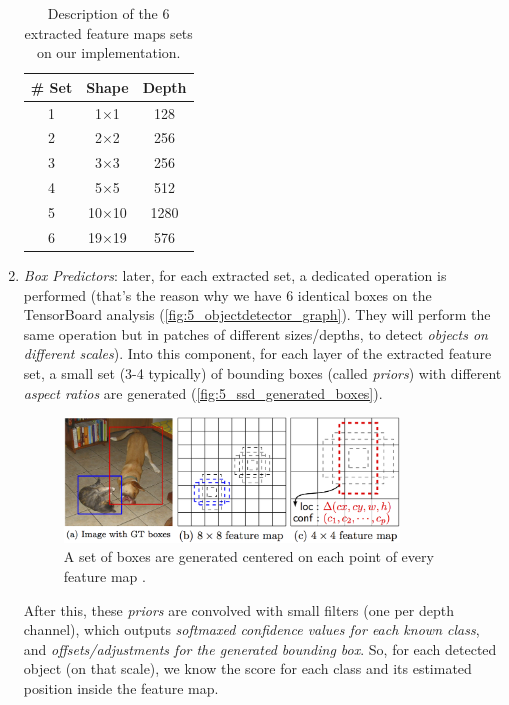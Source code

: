 \begin{enumerate}
			\begin{table}[h]
				\centering
				\begin{tabular}{|c|c|c|}\hline
					\textbf{\# Set} & \textbf{Shape} & \textbf{Depth} \\ \hline
					1              & 1$\times$1     & 128            \\
					2              & 2$\times$2     & 256            \\
					3              & 3$\times$3     & 256            \\
					4              & 5$\times$5     & 512            \\
					5              & 10$\times$10   & 1280           \\
					6              & 19$\times$19   & 576           \\ \hline
				\end{tabular}
				\caption{Description of the 6 extracted feature maps sets on our implementation.}
				\label{tab:5_sets_imagenet}
			\end{table}
	
			
			\item \emph{Box Predictors}: later, for each extracted set, a dedicated operation is performed (that's the reason why we have 6 identical boxes on the TensorBoard analysis (\autoref{fig:5_objectdetector_graph}). They will perform the same operation but in patches of different sizes/depths, to detect \emph{objects on different scales}). Into this component, for each layer of the extracted feature set, a small set (3-4 typically) of bounding boxes (called \emph{priors}) with different \emph{aspect ratios} are generated (\autoref{fig:5_ssd_generated_boxes}).
			
			\begin{figure}[h]
				\centering
				\includegraphics[width=3.5in]{images/ssd_generated_boxes}
				\caption{A set of boxes are generated centered on each point of every feature map \cite{ssd-paper}.}
				\label{fig:5_ssd_generated_boxes}
			\end{figure}
			
			After this, these \emph{priors} are convolved with small filters (one per depth channel), which outputs \emph{softmaxed confidence values for each known class}, and \emph{offsets/adjustments for the generated bounding box}. So, for each detected object (on that scale), we know the score for each class and its estimated position inside the feature map.
			

\end{enumerate}
